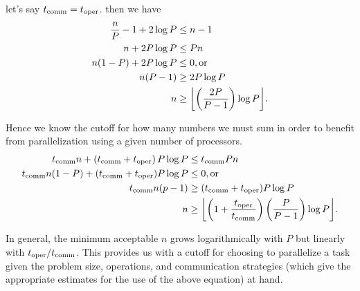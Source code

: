 let's say $t_\mathrm{comm} = t_\mathrm{oper}$. then we have
\begin{align*}
\frac{n}{P} - 1 + 2\log{P}  &\leq n-1                   \\
n + 2P\log{P}               &\leq Pn                    \\
n(1 - P) + 2P\log{P}        &\leq 0 \mathrm{, or}       \\
n(P - 1)                    &\geq 2P\log{P}             \\
n                           &\geq \floor*{\left(\frac{2P}{P-1}\right)\log{P}}.
\end{align*}

Hence we know the cutoff for how many numbers we must sum in order to benefit
from parallelization using a given number of processors. 
\begin{align*}
\tcomm n + \left(\tcomm+\toper\right)P\log{P}   &\leq \tcomm Pn                 \\
\tcomm n(1 - P) + (\tcomm+\toper)P\log{P}       &\leq 0 \mathrm{, or}           \\
\tcomm n(p - 1)                                 &\geq (\tcomm+\toper)P\log{P}   \\
n       &\geq \floor*{\left(1 + \frac{\toper}{\tcomm}\right)\left(\frac{P}{P-1}\right)\log{P}}.
\end{align*}

In general, the minimum acceptable $n$ grows logarithmically with $P$ but linearly
with $t_\mathrm{oper}/t_\mathrm{comm}$. This provides us with a cutoff for choosing to parallelize
a task given the problem size, operations, and communication strategies (which
give the appropriate estimates for the use of the above equation) at hand.

